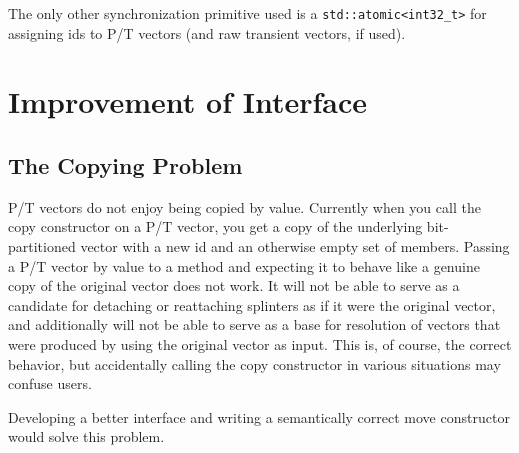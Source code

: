 The only other synchronization primitive used is a
\texttt{std::atomic<int32\_t>} for assigning ids to P/T vectors (and raw
transient vectors, if used).

\section{Improvement of Interface}

\subsection{The Copying Problem}
P/T vectors do not enjoy being copied by value. Currently when you call the copy
constructor on a P/T vector, you get a copy of the underlying bit-partitioned
vector with a new id and an otherwise empty set of members. Passing a P/T vector
by value to a method and expecting it to behave like a genuine copy of the
original vector does not work. It will not be able to serve as a candidate for
detaching or reattaching splinters as if it were the original vector, and
additionally will not be able to serve as a base for resolution of vectors that
were produced by using the original vector as input. This is, of course, the
correct behavior, but accidentally calling the copy constructor in various
situations may confuse users.

Developing a better interface and writing a semantically correct move
constructor would solve this problem.


